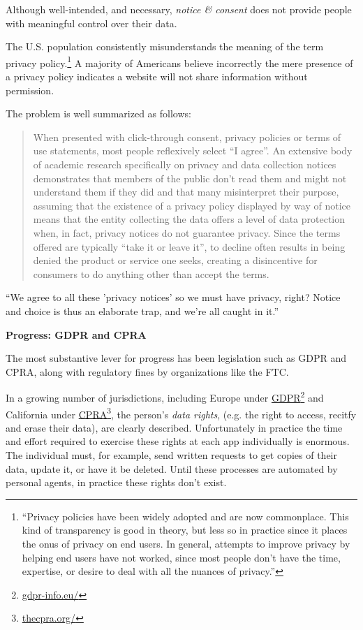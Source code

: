 \documentclass[11pt, oneside]{article}   	%
\newcommand{\hyperfootnote}[1][]{\def\ArgI{{#1}}\hyperfootnoteRelay}
\newcommand\hyperfootnoteRelay[2][]{\href{#1#2}{\ArgI}\footnote{\href{#1#2}{#2}}}
\begin{document}
Although well-intended, and necessary, \emph{notice \& consent} does not provide people with meaningful control over their data. 

The U.S. population consistently misunderstands the meaning of the term privacy policy.\footnote{``Privacy policies have been widely adopted and are now commonplace. This kind of transparency is good in theory, but less so in practice since it places the onus of privacy on end users. In general, attempts to improve privacy by helping end users have not worked, since most people don't have the time, expertise, or desire to deal with all the nuances of privacy.''\cite{Hong2023}} A majority of Americans believe incorrectly the mere presence of a privacy policy indicates a website will not share information without permission.\cite{Draper2019} 

The problem is well summarized as follows:
\begin{quote}
	When presented with click-through consent, privacy policies or terms of use statements, most people reflexively select ``I agree''. An extensive body of academic research specifically on privacy and data collection notices demonstrates that members of the public don't read them and might not understand them if they did and that many misinterpret their purpose, assuming that the existence of a privacy policy displayed by way of notice means that the entity collecting the data offers a level of data protection when, in fact, privacy notices do not guarantee privacy. Since the terms offered are typically ``take it or leave it'', to decline often results in being denied the product or service one seeks, creating a disincentive for consumers to do anything other than accept the terms.\cite{Flanagan2020}
\end{quote}

``We agree to all these 'privacy notices' so we must have privacy, right? Notice and choice is thus an elaborate trap, and we're all caught in it.''\cite{Richards2021}

\textbf{Progress: GDPR and CPRA}

The most substantive lever for progress has been legislation such as GDPR and CPRA, along with regulatory fines by organizations like the FTC. 

In a growing number of jurisdictions, including Europe under \hyperfootnote[GDPR][https://]{gdpr-info.eu/} and California under \hyperfootnote[CPRA][https://]{thecpra.org/}, the person's \emph{data rights}, (e.g. the right to access, recitfy and erase their data), are clearly described. Unfortunately in practice the time and effort required to exercise these rights at each app individually is enormous. The individual must, for example, send written requests to get copies of their data, update it, or have it be deleted. Until these processes are automated by personal agents, in practice these rights don't exist.
\end{document}
